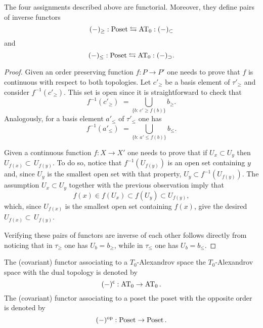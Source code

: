 \documentclass[main.tex]{subfiles}
\begin{document}
\begin{lemma}\label{from posets to A spaces and back}
The four assignments described above are functorial. Moreover, they define pairs of inverse functors
$$(-)_{\geq}:\Poset\leftrightarrows\AT_0:(-)_\subset$$
and
$$(-)_{\leq}:\Poset\leftrightarrows\AT_0:(-)_\supset.$$
\begin{proof}
Given an order preserving function $f:P\to P'$ one needs to prove that $f$ is continuous with respect to both topologies. Let $c'_\geq$ be a basis element of $\tau'_\geq$ and consider $f^{-1}(c'_\geq)$. This set is open since it is straightforward to check that
$$f^{-1}(c'_\geq)\,\,=\!\!\!\bigcup_{\{b:\,c'\geq f(b)\!\}}\!\!b_\geq.$$
Analogously, for a basis element $a'_\leq$ of $\tau'_\leq$ one has
$$f^{-1}(a'_\leq)\,\,=\!\!\!\bigcup_{\{b:\,a'\leq f(b)\!\}}\!\!b_\leq.$$

Given a continuous function $f:X\to X'$ one needs to prove that if $U_x\subset U_y$ then $U_{f(x)}\subset\, U_{f(y)}$. To do so, notice that $f^{-1}(U_{f(y)})$ is an open set containing $y$ and, since $U_y$ is the smallest open set with that property, $U_y\subset f^{-1}(U_{f(y)})$. The assumption $U_x\subset U_y$ together with the previous observation imply that
$$f(x)\in f(U_x)\subset f(U_y)\subset U_{f(y)},$$
which, since $U_{f(x)}$ is the smallest open set containing $f(x)$, give the desired $U_{f(x)}\subset\, U_{f(y)}$.

Verifying these pairs of functors are inverse of each other follows directly from noticing that in $\tau_\geq$ one has $U_b=b_\geq$, while in $\tau_\leq$ one has $U_b=b_\leq$.
\end{proof}
\end{lemma}

\begin{definition}
The (covariant) functor associating to a $T_0$-Alexandrov space the $T_0$-Alexandrov space with the dual topology is denoted by
$$(-)^\c:\AT_0\to\AT_0.$$
The (covariant) functor associating to a poset the poset with the opposite order is denoted by
$$(-)^{\mathrm{op}}:\operatorname{Poset}\to\operatorname{Poset}.$$
\end{definition}
\end{document}
